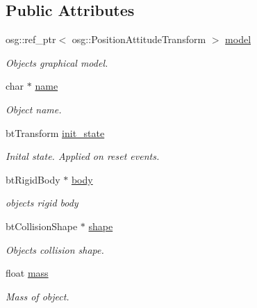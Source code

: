 \subsection*{Public Attributes}
\begin{DoxyCompactItemize}
\item 
\mbox{\label{classbtosgObject_afd15726e7a214212d6d5815f8ac1ac6c}} 
osg\+::ref\+\_\+ptr$<$ osg\+::\+Position\+Attitude\+Transform $>$ \hyperlink{classbtosgObject_afd15726e7a214212d6d5815f8ac1ac6c}{model}
\begin{DoxyCompactList}\small\item\em Object\textquotesingle{}s graphical model. \end{DoxyCompactList}\item 
\mbox{\label{classbtosgObject_a12396e1362797a75473a2e833b579cc9}} 
char $\ast$ \hyperlink{classbtosgObject_a12396e1362797a75473a2e833b579cc9}{name}
\begin{DoxyCompactList}\small\item\em Object name. \end{DoxyCompactList}\item 
\mbox{\label{classbtosgObject_a2dee023f311114e200df9b04c8c1b400}} 
bt\+Transform \hyperlink{classbtosgObject_a2dee023f311114e200df9b04c8c1b400}{init\+\_\+state}
\begin{DoxyCompactList}\small\item\em Inital state. Applied on reset events. \end{DoxyCompactList}\item 
\mbox{\label{classbtosgObject_a64ccde0543c184ed1749fdb9c9699785}} 
bt\+Rigid\+Body $\ast$ \hyperlink{classbtosgObject_a64ccde0543c184ed1749fdb9c9699785}{body}
\begin{DoxyCompactList}\small\item\em object\textquotesingle{}s rigid body \end{DoxyCompactList}\item 
\mbox{\label{classbtosgObject_a0f6a8da01cf643c321bffe86e42604b0}} 
bt\+Collision\+Shape $\ast$ \hyperlink{classbtosgObject_a0f6a8da01cf643c321bffe86e42604b0}{shape}
\begin{DoxyCompactList}\small\item\em Object\textquotesingle{}s collision shape. \end{DoxyCompactList}\item 
\mbox{\label{classbtosgObject_a2418bb2194d5e9b0f1c51c84672ba7d1}} 
float \hyperlink{classbtosgObject_a2418bb2194d5e9b0f1c51c84672ba7d1}{mass}
\begin{DoxyCompactList}\small\item\em Mass of object. \end{DoxyCompactList}\end{DoxyCompactItemize}


